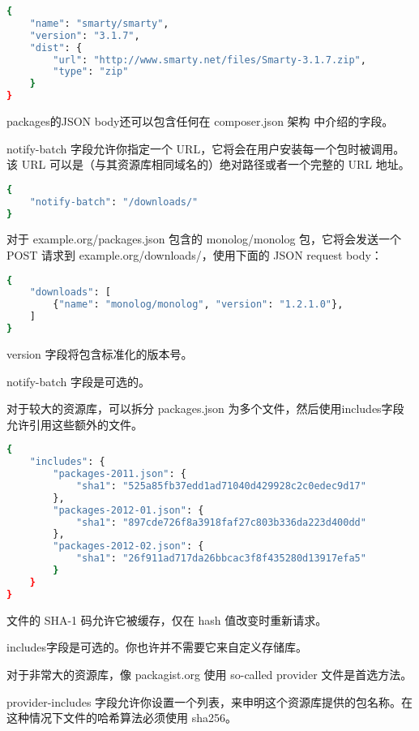 \begin{lstlisting}[language=bash]
{
    "name": "smarty/smarty",
    "version": "3.1.7",
    "dist": {
        "url": "http://www.smarty.net/files/Smarty-3.1.7.zip",
        "type": "zip"
    }
}
\end{lstlisting}

packages的JSON body还可以包含任何在 composer.json 架构 中介绍的字段。

notify-batch 字段允许你指定一个 URL，它将会在用户安装每一个包时被调用。该 URL 可以是（与其资源库相同域名的）绝对路径或者一个完整的 URL 地址。

\begin{lstlisting}[language=bash]
{
    "notify-batch": "/downloads/"
}
\end{lstlisting}

对于 example.org/packages.json 包含的 monolog/monolog 包，它将会发送一个 POST 请求到 example.org/downloads/，使用下面的 JSON request body：



\begin{lstlisting}[language=bash]
{
    "downloads": [
        {"name": "monolog/monolog", "version": "1.2.1.0"},
    ]
}
\end{lstlisting}

version 字段将包含标准化的版本号。

notify-batch 字段是可选的。


对于较大的资源库，可以拆分 packages.json 为多个文件，然后使用includes字段允许引用这些额外的文件。


\begin{lstlisting}[language=bash]
{
    "includes": {
        "packages-2011.json": {
            "sha1": "525a85fb37edd1ad71040d429928c2c0edec9d17"
        },
        "packages-2012-01.json": {
            "sha1": "897cde726f8a3918faf27c803b336da223d400dd"
        },
        "packages-2012-02.json": {
            "sha1": "26f911ad717da26bbcac3f8f435280d13917efa5"
        }
    }
}
\end{lstlisting}

文件的 SHA-1 码允许它被缓存，仅在 hash 值改变时重新请求。

includes字段是可选的。你也许并不需要它来自定义存储库。



对于非常大的资源库，像 packagist.org 使用 so-called provider 文件是首选方法。

provider-includes 字段允许你设置一个列表，来申明这个资源库提供的包名称。在这种情况下文件的哈希算法必须使用 sha256。

